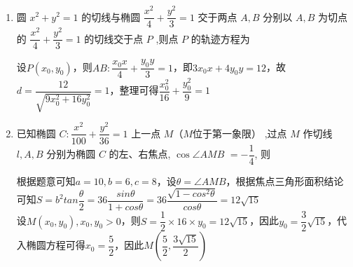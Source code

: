 \begin{enumerate}
\begin{enumerate}
\begin{jieda}
            令 $y = 0$ ,可得 $C\left( {\dfrac{2}{{x}_{1}},0}\right)$，令 $x = 0$ ,可得 $D\left( {0,\dfrac{1}{{y}_{1}}}\right)$，所以 $\bigtriangleup {OCD}$ 面积 $S = \dfrac{1}{2} \times  \dfrac{2}{{x}_{1}} \times  \dfrac{1}{{y}_{1}} = \dfrac{1}{{x}_{1}{y}_{1}}$
            
            又点 $B$ 在椭圆上,所以 $\dfrac{{x}_{1}^{2}}{2} + {y}_{1}^{2} = 1$，所以 $S = \dfrac{1}{{x}_{1}{y}_{1}} = \dfrac{\dfrac{{x}_{1}^{2}}{2} + {y}_{1}^{2}}{{x}_{1}{y}_{1}} = \dfrac{{x}_{1}}{2{y}_{1}} + \dfrac{{y}_{1}}{{x}_{1}} \geq  2\sqrt{\dfrac{{x}_{1}}{2{y}_{1}}\dfrac{{y}_{1}}{{x}_{1}}} = \sqrt{2}$，当且仅当 $\dfrac{{x}_{1}}{2{y}_{1}} = \dfrac{{y}_{1}}{{x}_{1}}$，即 ${x}_{1} = 1,{y}_{1} = \dfrac{\sqrt{2}}{2}$ 时等号成立
            
            所以 $\bigtriangleup {OCD}$ 面积的最小值为 $\sqrt{2}$ .
        \end{jieda} 
        \item 圆 ${x}^{2} + {y}^{2} = 1$ 的切线与椭圆 $\dfrac{{x}^{2}}{4} + \dfrac{{y}^{2}}{3} = 1$ 交于两点 $A,B$ 分别以 $A,B$ 为切点的 $\dfrac{{x}^{2}}{4} + \dfrac{{y}^{2}}{3} = 1$ 的切线交于点 $P$ ,则点 $P$ 的轨迹方程为
        \begin{jieda}
            设$P(x_0, y_0)$，则$AB: \dfrac{x_0x}{4}+\dfrac{y_0y}{3} = 1$，即$3x_0x+4y_0y = 12$，故$d = \dfrac{12}{\sqrt{9x_0^2+16y_0^2}} = 1$，整理可得$\dfrac{x_0^2}{16}+\dfrac{y_0^2}{9} = 1$
        \end{jieda}
        \item 已知椭圆 $C : \dfrac{{x}^{2}}{100} + \dfrac{{y}^{2}}{36} = 1$ 上一点 $M$（$M$位于第一象限） ,过点 $M$ 作切线 $l,A,B$ 分别为椭圆 $C$ 的左、右焦点, $\cos \angle {AMB}$  $=  - \dfrac{1}{4}$, 则
        
        \begin{jieda}
            根据题意可知$a = 10, b = 6, c = 8$，设$\theta = \angle{AMB}$，根据焦点三角形面积结论可知$S = b^2tan\dfrac{\theta}{2} = 36\dfrac{sin\theta}{1+cos\theta} = 36\dfrac{\sqrt{1-cos^2\theta}}{cos\theta} = 12\sqrt{15}$ \\
            设$M(x_0, y_0), x_0, y_0 > 0$，则$S = \dfrac{1}{2} \times 16 \times y_0 = 12\sqrt{15}$，因此$y_0 = \dfrac{3}{2}\sqrt{15}$，代入椭圆方程可得$x_0 = \dfrac{5}{2}$，因此$M\left(\dfrac{5}{2}, \dfrac{3\sqrt{15}}{2}\right)$
            

\end{jieda}
\end{enumerate}
\end{enumerate}
